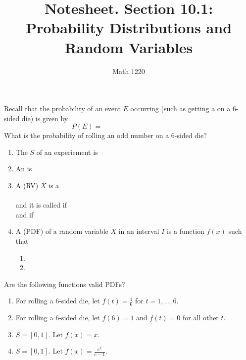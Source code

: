 \documentclass[12pt, a4paper]{article}
\author{Math 1220}
\title{Notesheet. Section 10.1: Probability Distributions and Random
  Variables}
\date{}
\begin{document}
\maketitle
\nameline
\vspace{-0.3in}
\begin{rmk}
  Recall that the probability of an event \(E\) occurring (such as
  getting a  on a \(6\)-sided die) is given by \[
    P(E) = \hspace{2in}
  \]
  What is the probability of rolling an odd number on a \(6\)-sided
  die?
  \vspace{0.5in}
\end{rmk}
\begin{defi}
  \begin{enumerate}
  \item The  \(S\) of an experiement is
  \item An  is
    \vspace{0.5in}
  \item A  (RV) \(X\) is a \\ \vspace{0.3in}\\
    and it is called  if \\
    and  if
    \vspace{1in}
  \item A  (PDF) of a random variable
    \(X\) in an 
    interval \(I\) is a function \(f(x)\) such that
    \begin{enumerate}[label=(\roman*)]
    \item 
    \item
    \end{enumerate}
  \end{enumerate}
\end{defi}
\vspace{-0.6in}
\begin{ex}
  Are the following functions valid PDFs?
  \begin{enumerate}
  \item For rolling a \(6\)-sided die, let \(f(t) = \frac{1}{6}\) for
    \(t=1,\ldots,6\).
    \vspace{0.3in}
  \item For rolling a \(6\)-sided die, let \(f(6)=1\) and \(f(t)=0\)
    for all other \(t\).
    \vspace{0.3in}
  \item \(S = [0,1]\). Let \(f(x)=x\).
    \vspace{0.3in}
  \item \(S = [0,1]\). Let \(f(x) = \frac{e^x}{e-1}\).
    \vspace{0.3in}
  \end{enumerate}
\end{ex}
\end{document}
